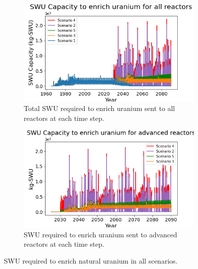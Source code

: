 \begin{figure}
    \centering
    \begin{subfigure}{0.5\textwidth}
        \centering
        \includegraphics[scale=0.5]{../figures/totalswu_scenarios_all.png}
        \caption{Total \gls{SWU} required to enrich uranium sent to all reactors at each time step.}
        \label{fig:totalswu_all}
    \end{subfigure}
    \hspace{0.8cm}
    \begin{subfigure}{0.5\textwidth}
        \centering
        \includegraphics[scale=0.5]{../figures/haleuSWU_scenarios_all.png}
        \caption{\gls{SWU} required to enrich uranium sent to advanced reactors at each time step.}
        \label{fig:haleuswu_al}
    \end{subfigure}
    \caption{\gls{SWU} required to enrich natural uranium in all scenarios.}
    \label{fig:swu_all}
\end{figure}

